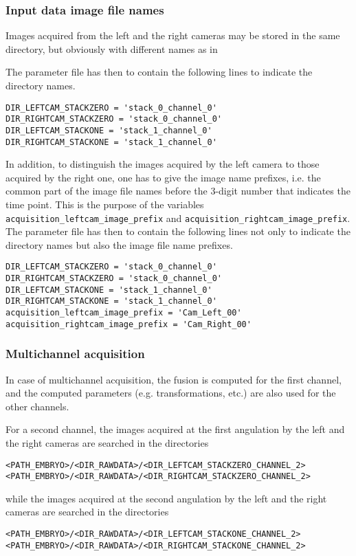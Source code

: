 \subsubsection{Input data image file names}

Images acquired from the left and the right cameras may be stored in
the same directory, but obviously with different names as in 

\mbox{}
\mbox{}

The parameter file has then to contain the following lines to indicate
the directory names.
\begin{verbatim}
DIR_LEFTCAM_STACKZERO = 'stack_0_channel_0'
DIR_RIGHTCAM_STACKZERO = 'stack_0_channel_0'
DIR_LEFTCAM_STACKONE = 'stack_1_channel_0'
DIR_RIGHTCAM_STACKONE = 'stack_1_channel_0'
\end{verbatim}

In addition, to distinguish the images acquired by the left camera to
those acquired by the right one, one has to give the image name
prefixes, i.e. the common part of the image file names before the
3-digit number that indicates the time point.
This is the purpose of the  variables
\verb|acquisition_leftcam_image_prefix| and 
\verb|acquisition_rightcam_image_prefix|.
The parameter file has then to contain the following lines not only to indicate
the directory names but also the image file name prefixes.

\begin{verbatim}
DIR_LEFTCAM_STACKZERO = 'stack_0_channel_0'
DIR_RIGHTCAM_STACKZERO = 'stack_0_channel_0'
DIR_LEFTCAM_STACKONE = 'stack_1_channel_0'
DIR_RIGHTCAM_STACKONE = 'stack_1_channel_0'
acquisition_leftcam_image_prefix = 'Cam_Left_00'
acquisition_rightcam_image_prefix = 'Cam_Right_00'
\end{verbatim}

\subsubsection{Multichannel acquisition}

In case of multichannel acquisition, the fusion is computed for the
first channel, and the computed parameters (e.g. transformations,
etc.) are also used for the other channels. 

For a second channel, 
the images acquired at the first angulation by the
left and the right cameras are searched in the directories
\begin{verbatim}
<PATH_EMBRYO>/<DIR_RAWDATA>/<DIR_LEFTCAM_STACKZERO_CHANNEL_2>
<PATH_EMBRYO>/<DIR_RAWDATA>/<DIR_RIGHTCAM_STACKZERO_CHANNEL_2>
\end{verbatim}
while the images acquired at the second angulation by the
left and the right cameras are searched in the directories
\begin{verbatim}
<PATH_EMBRYO>/<DIR_RAWDATA>/<DIR_LEFTCAM_STACKONE_CHANNEL_2>
<PATH_EMBRYO>/<DIR_RAWDATA>/<DIR_RIGHTCAM_STACKONE_CHANNEL_2>
\end{verbatim}

